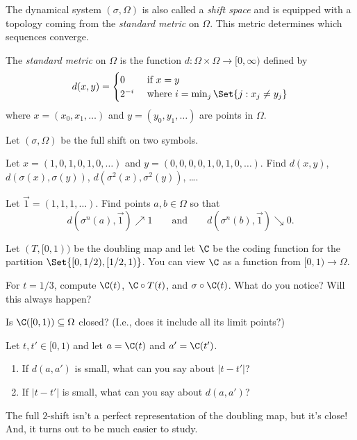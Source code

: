 	The dynamical system $(\sigma, \Omega)$ is also called a \emph{shift space} and is equipped
	with a topology coming from the \emph{standard metric} on $\Omega$. This metric determines which
	sequences converge.

	\begin{definition}
		The \emph{standard metric} on $\Omega$ is the function $d:\Omega\times \Omega\to[0,\infty)$ defined by
		\[
			d(x,y) = \begin{cases}
				0 & \text{ if }x=y\\
				2^{-i}&\text{ where } i=\min_j\Set{j:x_j\neq y_j}
			\end{cases}
		\]
		where $x=(x_0,x_1,\ldots)$ and $y=(y_0,y_1,\ldots)$ are points in $\Omega$.
	\end{definition}

	\question
	Let $(\sigma,\Omega)$ be the full shift on two symbols.
	\begin{parts}
		\item Let $x=(1,0,1,0,1,0,\ldots)$ and $y=(0,0,0,0,1,0,1,0,\ldots)$.
			Find $d(x,y)$, $d(\sigma(x),\sigma(y))$, $d(\sigma^2(x),\sigma^2(y))$, \ldots.
		\item Let $\vec 1 = (1,1,1,\ldots)$. Find points $a,b\in\Omega$ so that 
			\[
				d(\sigma^n(a),\vec 1)\nearrow 1
			\qquad\text{and}\qquad
				d(\sigma^n(b),\vec 1)\searrow 0.
			\]

		\item Let $(T,[0,1))$ be the doubling map and let $\C$ be the coding function
			for the partition $\Set{[0,1/2),[1/2,1)}$. You can view $\C$ as a function
			from $[0,1)\to\Omega$.

			For $t=1/3$, compute $\C(t)$, $\C\circ T(t)$, and $\sigma\circ \C(t)$. What
			do you notice? Will this always happen?
		\item Is $\C([0,1))\subseteq \Omega$ closed? (I.e., does it include all its limit points?)
		\item Let $t,t'\in[0,1)$ and let $a=\C(t)$ and $a'=\C(t')$.
			\begin{enumerate}
				\item If $d(a,a')$ is small, what can you say about $|t-t'|$?
				\item If $|t-t'|$ is small, what can you say about $d(a,a')$?
			\end{enumerate}
	\end{parts}

	\newpage
	The full $2$-shift isn't a perfect representation of the doubling map, but it's close! And, it
	turns out to be much easier to study.

